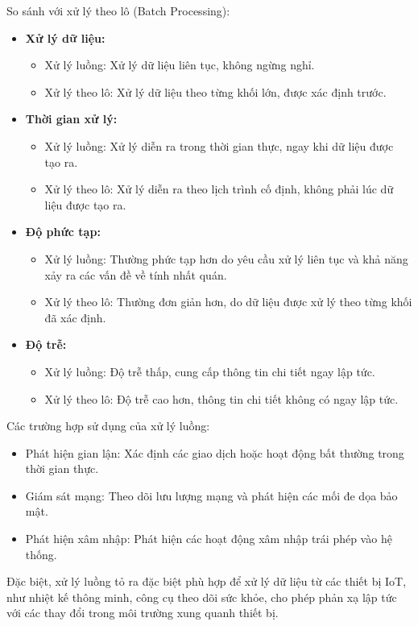 So sánh với xử lý theo lô (Batch Processing):
\begin{itemize}
    \item \textbf{Xử lý dữ liệu:}
          \begin{itemize}
              \item Xử lý luồng: Xử lý dữ liệu liên tục, không ngừng nghỉ.
              \item Xử lý theo lô: Xử lý dữ liệu theo từng khối lớn, được xác định trước.
          \end{itemize}
    \item \textbf{Thời gian xử lý:}
          \begin{itemize}
              \item Xử lý luồng: Xử lý diễn ra trong thời gian thực, ngay khi dữ liệu được tạo ra.
              \item Xử lý theo lô: Xử lý diễn ra theo lịch trình cố định, không phải lúc dữ liệu được tạo ra.
          \end{itemize}
    \item \textbf{Độ phức tạp:}
          \begin{itemize}
              \item Xử lý luồng: Thường phức tạp hơn do yêu cầu xử lý liên tục và khả năng xảy ra các vấn đề về tính nhất quán.
              \item Xử lý theo lô: Thường đơn giản hơn, do dữ liệu được xử lý theo từng khối đã xác định.
          \end{itemize}
    \item \textbf{Độ trễ:}
          \begin{itemize}
              \item Xử lý luồng: Độ trễ thấp, cung cấp thông tin chi tiết ngay lập tức.
              \item Xử lý theo lô: Độ trễ cao hơn, thông tin chi tiết không có ngay lập tức.
          \end{itemize}
\end{itemize}

Các trường hợp sử dụng của xử lý luồng:
\begin{itemize}
    \item Phát hiện gian lận: Xác định các giao dịch hoặc hoạt động bất thường trong thời gian thực.
    \item Giám sát mạng: Theo dõi lưu lượng mạng và phát hiện các mối đe dọa bảo mật.
    \item Phát hiện xâm nhập: Phát hiện các hoạt động xâm nhập trái phép vào hệ thống.
\end{itemize}
Đặc biệt, xử lý luồng tỏ ra đặc biệt phù hợp để xử lý dữ liệu từ các thiết bị IoT, như nhiệt kế thông minh, công cụ theo dõi sức khỏe, cho phép phản xạ lập tức với các thay đổi trong môi trường xung quanh thiết bị.

